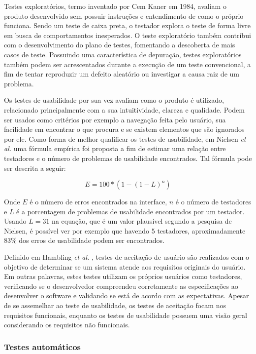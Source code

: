 Testes exploratórios, termo inventado por Cem Kaner \cite{kaner} em 1984, avaliam o produto desenvolvido sem possuir instruções e entendimento de como o próprio funciona. Sendo um teste de caixa preta, o testador explora o teste de forma livre em busca de comportamentos inesperados. O teste exploratório também contribui com o desenvolvimento do plano de testes, fomentando a descoberta de mais casos de teste. Possuindo uma característica de depuração, testes exploratórios também podem ser acrescentados durante a execução de um teste convencional, a fim de tentar reproduzir um defeito aleatório ou investigar a causa raiz de um problema.

Os testes de usabilidade por sua vez avaliam como o produto é utilizado, relacionado principalmente com a sua intuitividade, clareza e qualidade. Podem ser usados como critérios por exemplo a navegação feita pelo usuário, sua facilidade em encontrar o que procura e se existem elementos que são ignorados por ele. Como forma de melhor qualificar os testes de usabilidade, em Nielsen \emph{et al.} \cite{nielsen} uma fórmula empírica foi proposta a fim de estimar uma relação entre testadores e o número de problemas de usabilidade encontrados. Tal fórmula pode ser descrita a seguir:

\[ E = 100 * (1 - (1 - L)^n)\]

Onde $E$ é o número de erros encontrados na interface, $n$ é o número de testadores e $L$ é a porcentagem de problemas de usabilidade encontrados por um testador. Usando $L = 31$ na equação, que é um valor plausível segundo a pesquisa de Nielsen, é possível ver por exemplo que havendo 5 testadores, aproximadamente 83\% dos erros de usabilidade podem ser encontrados.

Definido em Hambling \emph{et al.} \cite{hambling}, testes de aceitação de usuário são realizados com o objetivo de determinar se um sistema atende aos requisitos originais do usuário. Em outras palavras, estes testes utilizam os próprios usuários como testadores, verificando se o desenvolvedor compreendeu corretamente as especificações ao desenvolver o software e validando se está de acordo com as expectativas. Apesar de se assemelhar ao teste de usabilidade, os testes de aceitação focam nos requisitos funcionais, enquanto os testes de usabilidade possuem uma visão geral considerando os requisitos não funcionais.

\hypertarget{testes-automaticos}{%
\subsubsection{Testes automáticos}\label{testes-automaticos}}

